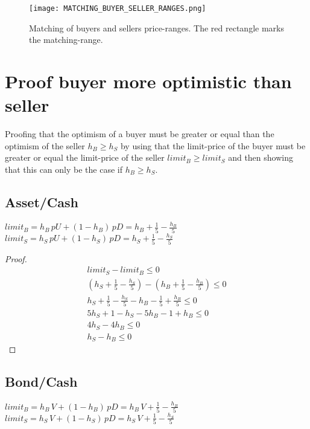 \documentclass[Bachelorarbeit.tex]{subfiles}
\begin{document}
\begin{figure}[H]
	\centering
  \texttt{[image: MATCHING\_BUYER\_SELLER\_RANGES.png]}
  	\caption{Matching of buyers and sellers price-ranges. The red rectangle marks the matching-range.}
	\label{fig:MATCHING_BUYER_SELLER_RANGES}
\end{figure}

\section{Proof buyer more optimistic than seller}
Proofing that the optimism of a buyer must be greater or equal than the optimism of the seller $h_B \geq h_S$ by using that the limit-price of the buyer must be greater or equal the limit-price of the seller $limit_B \geq limit_S$ and then showing that this can only be the case if $h_B \geq h_S$.

\subsection{Asset/Cash}
$limit_B = h_B \, pU + (1-h_B) \, pD = h_B + \frac{1}{5} - \frac{h_B}{5}$ \\
$limit_S = h_S \, pU + (1-h_S) \, pD = h_S + \frac{1}{5} - \frac{h_S}{5}$

\begin{proof}
\begin{align*}
	limit_S - limit_B \leq 0
	\\ (h_S + \frac{1}{5} - \frac{h_S}{5}) - ( h_B + \frac{1}{5} - \frac{h_B}{5} ) \leq 0
	\\ h_S + \frac{1}{5} - \frac{h_S}{5} - h_B - \frac{1}{5} + \frac{h_B}{5} \leq 0
	\\ 5h_S + 1 - h_S - 5h_B - 1 + h_B \leq 0
	\\ 4h_S - 4h_B \leq 0
	\\ h_S - h_B \leq 0		\tag*{can only hold if $h_B \geq h_S$}
\end{align*}
\end{proof}

\subsection{Bond/Cash}
$limit_B = h_B \, V + (1-h_B) \, pD = h_B \, V + \frac{1}{5} - \frac{h_B}{5}$ \\
$limit_S = h_S \, V + (1-h_S) \, pD = h_S \, V + \frac{1}{5} - \frac{h_S}{5}$
\end{document}
